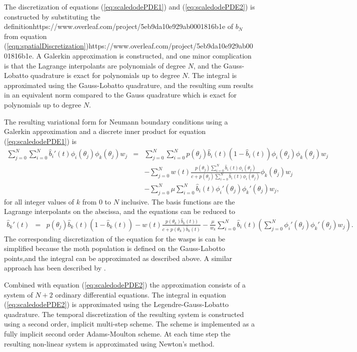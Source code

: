 \documentclass[review,authoryear]{elsarticle}
\begin{document}
The discretization of equations (\ref{eq:scaledodePDE1}) and
(\ref{eq:scaledodePDE2}) is constructed by substituting the definitionhttps://www.overleaf.com/project/5eb9da10e929ab0001816b1e
of $b_N$ from equation (\ref{eqn:spatialDiscretization})https://www.overleaf.com/project/5eb9da10e929ab0001816b1e. A Galerkin
approximation is constructed, and one minor complication is that the
Lagrange interpolants are polynomials of degree $N$, and the
Gauss-Lobatto quadrature is exact for polynomials up to degree
$N$. The integral is approximated using the Gauss-Lobatto quadrature,
and the resulting sum results in an equivalent norm compared to the
Gauss quadrature which is exact for polynomials up to degree
$N$\citep{SobolevCanutoQuarteroni}.

The resulting variational form for Neumann boundary conditions using a
Galerkin approximation and a discrete inner product for equation
(\ref{eq:scaledodePDE1}) is
\begin{eqnarray}
  \sum_{j=0}^N \sum_{i=0}^N  \hat{b}_i'(t) \phi_i(\theta_j) \phi_k(\theta_j) w_j
  & = &
  \sum_{j=0}^N \sum_{i=0}^N p(\theta_j)  \hat{b}_i(t) (1 - \hat{b}_i(t) ) \phi_i(\theta_j) \phi_k(\theta_j) w_j \\
  & &  -  \sum_{j=0}^N w(t) \frac{p(\theta_j) \sum_{i=0}^N \hat{b}_i(t) \phi_i(\theta_j) }{c+p(\theta_j) \sum_{i=0}^N \hat{b}_i(t) \phi_i(\theta_j)} \phi_k(\theta_j) w_j \nonumber \\ 
  & & - \sum_{j=0}^N \mu  \sum_{i=0}^N \hat{b}_i(t) \phi_i'(\theta_j) \phi_k'(\theta_j)  w_j, \nonumber
\end{eqnarray}
for all integer values of $k$ from $0$ to $N$ inclusive.  The basis
functions are the Lagrange interpolants on the abscissa, and the
equations can be reduced to
\begin{eqnarray}
  \hat{b}_k'(t) 
  & = &
        p(\theta_j) \hat{b}_k(t) (1 - \hat{b}_k(t) )
        -  w(t) \frac{p(\theta_k) \hat{b}_k(t)) }{c+p(\theta_k)  \hat{b}_k(t) }  
   - \frac{\mu}{w_k} \sum_{i=0}^N \hat{b}_i(t) \left( \sum_{j=0}^N  \phi_i'(\theta_j) \phi_k'(\theta_j)  w_j \right).
\end{eqnarray}
The corresponding discretization of the equation for the wasps is can be simplified because the moth population is defined on the Gauss-Labotto points,and the integral can be approximated as described above. A similar approach has been described by \cite{doi:10.1002/mma.1318}.

Combined with equation (\ref{eq:scaledodePDE2}) the approximation
consists of a system of $N+2$ ordinary differential equations. The
integral in equation (\ref{eq:scaledodePDE2}) is approximated using
the Legendre-Gauss-Lobatto quadrature. The temporal discretization of
the resulting system is constructed using a second order, implicit
multi-step scheme. The scheme is implemented as a fully implicit
second order Adams-Moulton scheme\citep{ascher2011first}. At each time
step the resulting non-linear system is approximated using Newton's
method.



\clearpage
%


\end{document}
